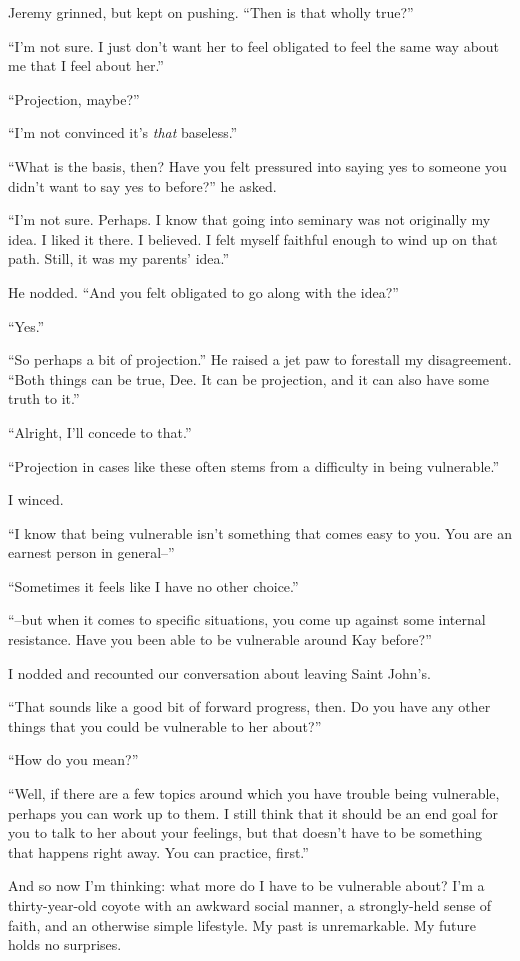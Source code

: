 Jeremy grinned, but kept on pushing. ``Then is that wholly true?''

``I'm not sure. I just don't want her to feel obligated to feel the same way about me that I feel about her.''

``Projection, maybe?''

``I'm not convinced it's \emph{that} baseless.''

``What is the basis, then? Have you felt pressured into saying yes to someone you didn't want to say yes to before?'' he asked.

``I'm not sure. Perhaps. I know that going into seminary was not originally my idea. I liked it there. I believed. I felt myself faithful enough to wind up on that path. Still, it was my parents' idea.''

He nodded. ``And you felt obligated to go along with the idea?''

``Yes.''

``So perhaps a bit of projection.'' He raised a jet paw to forestall my disagreement. ``Both things can be true, Dee. It can be projection, and it can also have some truth to it.''

``Alright, I'll concede to that.''

``Projection in cases like these often stems from a difficulty in being vulnerable.''

I winced.

``I know that being vulnerable isn't something that comes easy to you. You are an earnest person in general--''

``Sometimes it feels like I have no other choice.''

``--but when it comes to specific situations, you come up against some internal resistance. Have you been able to be vulnerable around Kay before?''

I nodded and recounted our conversation about leaving Saint John's.

``That sounds like a good bit of forward progress, then. Do you have any other things that you could be vulnerable to her about?''

``How do you mean?''

``Well, if there are a few topics around which you have trouble being vulnerable, perhaps you can work up to them. I still think that it should be an end goal for you to talk to her about your feelings, but that doesn't have to be something that happens right away. You can practice, first.''

And so now I'm thinking: what more do I have to be vulnerable about? I'm a thirty-year-old coyote with an awkward social manner, a strongly-held sense of faith, and an otherwise simple lifestyle. My past is unremarkable. My future holds no surprises.

